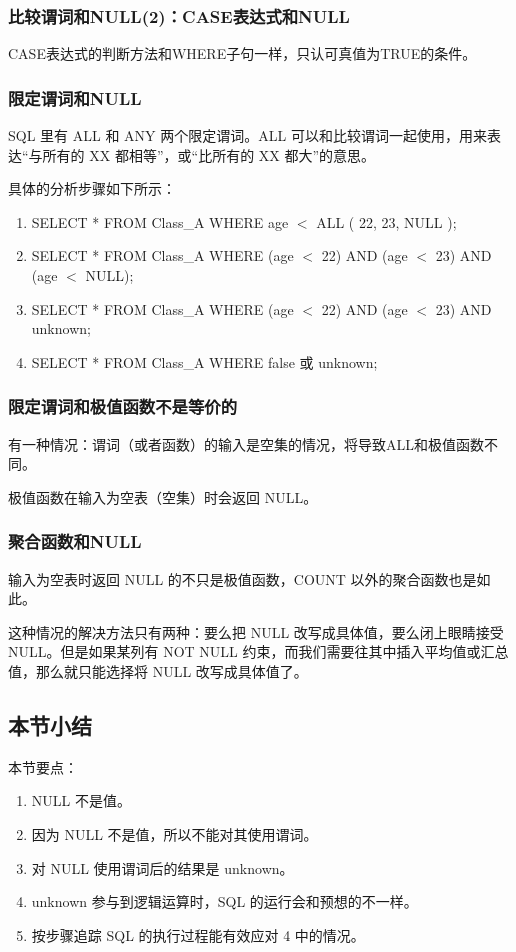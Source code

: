 \subsubsection*{比较谓词和NULL(2)：CASE表达式和NULL}
CASE表达式的判断方法和WHERE子句一样，只认可真值为TRUE的条件。

\subsubsection*{限定谓词和NULL}
SQL 里有 ALL 和 ANY 两个限定谓词。ALL 可以和比较谓词一起使用，用来表达“与所有的 XX 都相等”，或“比所有的 XX 都大”的意思。

具体的分析步骤如下所示：
\begin{enumerate}
    \item \textsf{SELECT * FROM Class\_A WHERE age $<$ ALL ( 22, 23, NULL );}
    \item \textsf{SELECT * FROM Class\_A WHERE (age $<$ 22) AND (age $<$ 23) AND (age $<$ NULL);}
    \item \textsf{SELECT * FROM Class\_A WHERE (age $<$ 22) AND (age $<$ 23) AND unknown;}
    \item \textsf{SELECT * FROM Class\_A WHERE false 或 unknown;}
\end{enumerate}
\subsubsection*{限定谓词和极值函数不是等价的}
有一种情况：谓词（或者函数）的输入是空集的情况，将导致ALL和极值函数不同。

极值函数在输入为空表（空集）时会返回 NULL。

\subsubsection*{聚合函数和NULL}
输入为空表时返回 NULL 的不只是极值函数，COUNT 以外的聚合函数也是如此。

这种情况的解决方法只有两种：要么把 NULL 改写成具体值，要么闭上眼睛接受NULL。但是如果某列有 NOT NULL 约束，而我们需要往其中插入平均值或汇总值，那么就只能选择将 NULL 改写成具体值了。
\subsection{本节小结}
本节要点：
\begin{enumerate}
    \item NULL 不是值。
    \item 因为 NULL 不是值，所以不能对其使用谓词。
    \item 对 NULL 使用谓词后的结果是 unknown。
    \item unknown 参与到逻辑运算时，SQL 的运行会和预想的不一样。
    \item 按步骤追踪 SQL 的执行过程能有效应对 4 中的情况。
\end{enumerate}

